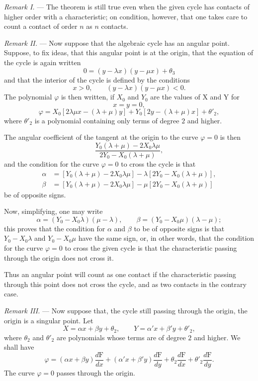 \documentclass[11pt]{article}
\begin{document}
\emph{Remark I.} --- The theorem is still true even when the given cycle has contacts of higher order with a characteristic; on condition, however, that one takes care to count a contact of order $n$ as $n$ contacts.

\emph{Remark II.} --- Now suppose that the algebraic cycle has an angular point. Suppose, to fix ideas, that this angular point is at the origin, that the equation of the cycle is again written
\[
0=(y-\lambda x)(y-\mu x)+\theta_3
\]
and that the interior of the cycle is defined by the conditions
\[
x>0,\qquad (y-\lambda x)(y-\mu x)<0.
\]
The polynomial $\varphi$ is then written, if $X_0$ and $Y_0$ are the values of X and Y for
\[
x=y=0,
\]
\[
\varphi=X_0[2\lambda\mu x-(\lambda+\mu)y]+Y_0[2y-(\lambda+\mu)x]+\theta'_2,
\]
where $\theta'_2$ is a polynomial containing only terms of degree $2$ and higher.

The angular coefficient of the tangent at the origin to the curve $\varphi=0$ is then
\[
\frac{Y_0(\lambda+\mu)-2X_0\lambda\mu}{2Y_0-X_0(\lambda+\mu)},
\]
and the condition for the curve $\varphi=0$ to cross the cycle is that
\[
\begin{aligned}
\alpha&=[Y_0(\lambda+\mu)-2X_0\lambda\mu]-\lambda[2Y_0-X_0(\lambda+\mu)],\\
\beta&=[Y_0(\lambda+\mu)-2X_0\lambda\mu]-\mu[2Y_0-X_0(\lambda+\mu)]
\end{aligned}
\]
be of opposite signs.

Now, simplifying, one may write
\[
\alpha=(Y_0-X_0\lambda)(\mu-\lambda),
\qquad
\beta=(Y_0-X_0\mu)(\lambda-\mu);
\]
this proves that the condition for $\alpha$ and $\beta$ to be of opposite signs is that $Y_0-X_0\lambda$ and $Y_0-X_0\mu$ have the same sign, or, in other words, that the condition for the curve $\varphi=0$ to cross the given cycle is that the characteristic passing through the origin does not cross it.

Thus an angular point will count as one contact if the characteristic passing through this point does not cross the cycle, and as two contacts in the contrary case.

\emph{Remark III.} --- Now suppose that, the cycle still passing through the origin, the origin is a singular point. Let
\[
X=\alpha x+\beta y+\theta_2,
\qquad
Y=\alpha'x+\beta'y+\theta'_2,
\]
where $\theta_2$ and $\theta'_2$ are polynomials whose terms are of degree $2$ and higher. We shall have
\[
\varphi=(\alpha x+\beta y)\frac{d\mathrm F}{dx}+(\alpha'x+\beta'y)\frac{d\mathrm F}{dy}
+\theta_2\frac{d\mathrm F}{dx}+\theta'_2\frac{d\mathrm F}{dy}.
\]
The curve $\varphi=0$ passes through the origin.
\end{document}
